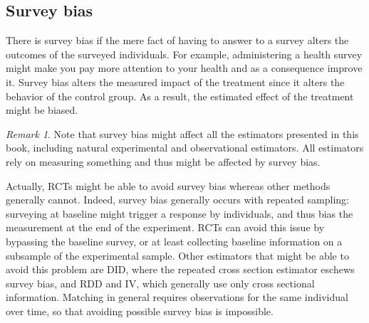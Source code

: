 \documentclass[
]{book}
\theoremstyle{definition}
\theoremstyle{definition}
\theoremstyle{definition}
\theoremstyle{definition}
\theoremstyle{remark}
\newtheorem*{remark}{Remark}
\begin{document}
\hypertarget{survey-bias}{%
\subsection{Survey bias}\label{survey-bias}}

There is survey bias if the mere fact of having to answer to a survey alters the outcomes of the surveyed individuals.
For example, administering a health survey might make you pay more attention to your health and as a consequence improve it.
Survey bias alters the measured impact of the treatment since it alters the behavior of the control group.
As a result, the estimated effect of the treatment might be biased.

\begin{remark}
\iffalse{} {Remark. } \fi{}Note that survey bias might affect all the estimators presented in this book, including natural experimental and observational estimators.
All estimators rely on measuring something and thus might be affected by survey bias.

Actually, RCTs might be able to avoid survey bias whereas other methods generally cannot.
Indeed, survey bias generally occurs with repeated sampling: surveying at baseline might trigger a response by individuals, and thus bias the measurement at the end of the experiment.
RCTs can avoid this issue by bypassing the baseline survey, or at least collecting baseline information on a subsample of the experimental sample.
Other estimators that might be able to avoid this problem are DID, where the repeated cross section estimator eschews survey bias, and RDD and IV, which generally use only cross sectional information.
Matching in general requires observations for the same individual over time, so that avoiding possible survey bias is impossible.
\end{remark}
\end{document}
